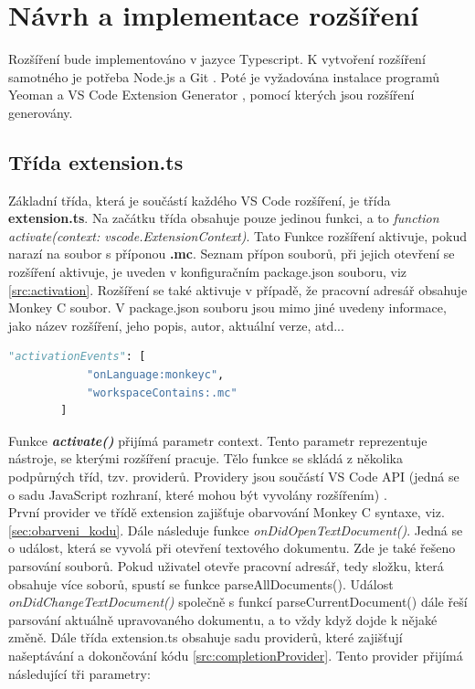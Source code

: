 \chapter{Návrh a implementace rozšíření} \label{5Chapter}
Rozšíření bude implementováno v jazyce Typescript. K vytvoření rozšíření samotného je potřeba Node.js \cite{nodejs} a Git \cite{git}. Poté je vyžadována instalace programů Yeoman \cite{yeoman} a VS Code Extension Generator \cite{YO_Generator}, pomocí kterých jsou rozšíření generovány.\\

\section{Třída extension.ts}
Základní třída, která je součástí každého VS Code rozšíření, je třída \textbf{extension.ts}. Na začátku třída obsahuje pouze jedinou funkci, a to \textit{function activate(context: vscode.ExtensionContext)}. Tato Funkce rozšíření aktivuje, pokud narazí na soubor s příponou \textbf{.mc}. Seznam přípon souborů, při jejich otevření se rozšíření aktivuje, je uveden v konfiguračním package.json souboru, viz \ref{src:activation}. Rozšíření se také aktivuje v případě, že pracovní adresář obsahuje Monkey C soubor. V package.json souboru jsou mimo jiné uvedeny informace, jako název rozšíření, jeho popis, autor, aktuální verze, atd...\\

\begin{lstlisting}[language=Python,label=src:activation,caption={aktivační události rozšíření}]
        "activationEvents": [
			"onLanguage:monkeyc",
			"workspaceContains:.mc"
		]
\end{lstlisting}

Funkce \textit{\textbf{activate()}} přijímá parametr context. Tento parametr reprezentuje nástroje, se kterými rozšíření pracuje. Tělo funkce se skládá z několika podpůrných tříd, tzv. providerů. Providery jsou součástí VS Code API (jedná se o sadu JavaScript rozhraní, které mohou být vyvolány rozšířením) \cite{vscodeAPI}. \\
První provider ve třídě extension zajišťuje obarvování Monkey C syntaxe, viz. \ref{sec:obarveni_kodu}. Dále následuje funkce \textit{onDidOpenTextDocument()}. Jedná se o událost, která se vyvolá při otevření textového dokumentu. Zde je také řešeno parsování souborů. Pokud uživatel otevře pracovní adresář, tedy složku, která obsahuje více soborů, spustí se funkce parseAllDocuments(). Událost \textit{onDidChangeTextDocument()} společně s funkcí parseCurrentDocument() dále řeší parsování aktuálně upravovaného dokumentu, a to vždy když dojde k nějaké změně. Dále třída extension.ts obsahuje sadu providerů, které zajišťují našeptávání a dokončování kódu \ref{src:completionProvider}. Tento provider přijímá následující tři parametry: 

